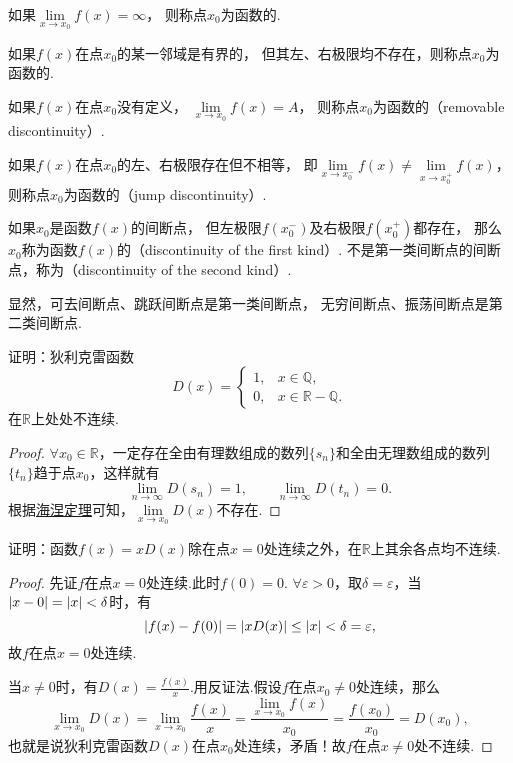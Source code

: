 \begin{definition}
如果\(\lim\limits_{x \to x_0}f(x) = \infty\)，
则称点\(x_0\)为函数的.

如果\(f(x)\)在点\(x_0\)的某一邻域是有界的，
但其左、右极限均不存在，则称点\(x_0\)为函数的.

如果\(f(x)\)在点\(x_0\)没有定义，
\(\lim\limits_{x \to x_0}f(x) = A\)，
则称点\(x_0\)为函数的（removable discontinuity）.

如果\(f(x)\)在点\(x_0\)的左、右极限存在但不相等，
即\(\lim\limits_{x \to x_0^-}f(x) \neq \lim\limits_{x \to x_0^+}f(x)\)，
则称点\(x_0\)为函数的（jump discontinuity）.

如果\(x_0\)是函数\(f(x)\)的间断点，
但左极限\(f(x_0^-)\)及右极限\(f(x_0^+)\)都存在，
那么\(x_0\)称为函数\(f(x)\)的（discontinuity of the first kind）.
不是第一类间断点的间断点，称为（discontinuity of the second kind）.
\end{definition}
显然，可去间断点、跳跃间断点是第一类间断点，
无穷间断点、振荡间断点是第二类间断点.

\begin{example}\label{example:极限.狄利克雷函数在实数域上处处不连续}
证明：狄利克雷函数\[
D(x) = \left\{ \begin{array}{ll}
1, & x \in \mathbb{Q}, \\
0, & x \in \mathbb{R} - \mathbb{Q}.
\end{array} \right.
\]在\(\mathbb{R}\)上处处不连续.
\begin{proof}
\(\forall x_0 \in \mathbb{R}\)，一定存在全由有理数组成的数列\(\{s_n\}\)和全由无理数组成的数列\(\{t_n\}\)趋于点\(x_0\)，这样就有\[
\lim\limits_{n\to\infty} D(s_n) = 1,
\qquad
\lim\limits_{n\to\infty} D(t_n) = 0.
\]
根据\hyperref[theorem:极限.海涅定理]{海涅定理}可知，\(\lim\limits_{x \to x_0} D(x)\)不存在.
\end{proof}
\end{example}

\begin{example}
证明：函数\(f(x) = x D(x)\)除在点\(x = 0\)处连续之外，在\(\mathbb{R}\)上其余各点均不连续.
\begin{proof}
先证\(f\)在点\(x = 0\)处连续.此时\(f(0) = 0\).
\(\forall \varepsilon > 0\)，取\(\delta = \varepsilon\)，当\(\abs{x - 0} = \abs{x} < \delta\)时，有\[
\abs{f(x) - f(0)}
= \abs{ x D(x) }
\leq \abs{x} < \delta = \varepsilon,
\]故\(f\)在点\(x = 0\)处连续.

当\(x \neq 0\)时，有\(D(x) = \frac{f(x)}{x}\).用反证法.假设\(f\)在点\(x_0 \neq 0\)处连续，那么\[
\lim\limits_{x \to x_0} D(x) = \lim\limits_{x \to x_0} \frac{f(x)}{x}
= \frac{ \lim\limits_{x \to x_0} f(x) }{x_0}
= \frac{f(x_0)}{x_0} = D(x_0),
\]也就是说狄利克雷函数\(D(x)\)在点\(x_0\)处连续，矛盾！故\(f\)在点\(x \neq 0\)处不连续.
\end{proof}
\end{example}

